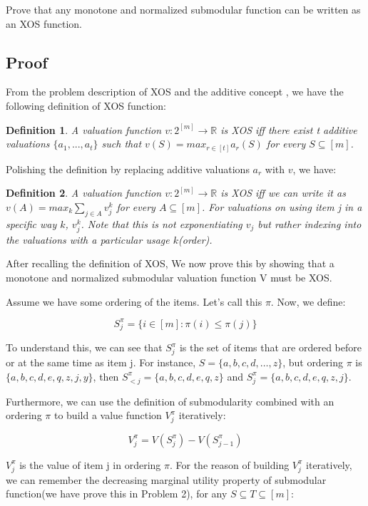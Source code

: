 \documentclass{article}
\newtheorem{definition}{Definition}
\begin{document}
Prove that any monotone and normalized submodular function can be written as an XOS function.

\subsection{Proof}

From the problem description of XOS and the additive concept , we have the following definition of XOS function:

\begin{definition}
   A valuation function $v : 2^{[m]} \rightarrow \mathbb{R}$ is XOS iff there exist t additive valuations $\{a_1, . . . , a_t\}$ such that $v(S) = max_{r \in [t]} a_r(S)$ for every $S \subseteq [m]$.
\end{definition}

Polishing the definition by replacing additive valuations $a_r$ with $v$, we have:

\begin{definition}
   A valuation function $v : 2^{[m]} \rightarrow \mathbb{R}$ is XOS iff we can write it as $v(A) = max_{k}\sum_{j \in A} v^k_j$ for every $A \subseteq [m]$.  For valuations on using item j in a specific way $k$, $v^k_j$. Note that this is not exponentiating $v_j$ but rather indexing into the valuations with a particular usage $k$(order).
\end{definition}

After recalling the definition of XOS, We now prove this by showing that a monotone and normalized submodular valuation function V must be XOS.

Assume we have some ordering of the items. Let's call this $\pi$. Now, we define:

\[
  S^{\pi}_j = \{i \in [m] : \pi(i) \le \pi(j)\}
\]

To understand this, we can see that $S^{\pi}_j$ is the set of items that are ordered before or at the same time as item j. For instance, $S = \{a,b,c,d,\ldots,z\}$, but ordering $\pi$ is $\{a, b, c, d, e, q, z, j, y\}$, then $S^{\pi}_{<j} = \{a, b, c, d, e, q, z\}$ and $S^{\pi}_{j} = \{a, b, c, d, e, q, z, j\}$. 

Furthermore, we can use the definition of submodularity combined with an ordering $\pi$ to build a value function $V^{\pi}_j$ iteratively:

\[
  V^{\pi}_j = V(S^{\pi}_j) - V(S^{\pi}_{j-1})
\]

$V^{\pi}_j$ is the value of item j in ordering $\pi$. For the reason of building $V^{\pi}_j$ iteratively, we can remember the decreasing marginal utility property of submodular function(we have prove this in Problem 2), for any $S \subseteq T \subseteq [m]$:
\end{document}
